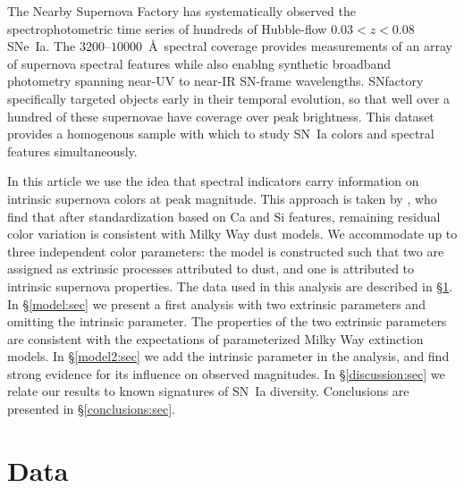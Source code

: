 \documentclass{aastex61}   	%
\begin{document}
The Nearby Supernova Factory \citep[SNfactory;][]{2002SPIE.4836...61A} has systematically observed the
spectrophotometric time series of hundreds of Hubble-flow $0.03<z<0.08$ SNe~Ia.   The $3200$--$10000$~\AA\ spectral coverage
provides measurements of an array of supernova spectral features while also enablng synthetic broadband photometry
spanning near-UV to near-IR SN-frame wavelengths.  SNfactory specifically targeted objects
early in their temporal evolution, so that well over a hundred of these supernovae have  coverage over
peak brightness.  This dataset provides a homogenous sample with which to study SN~Ia colors and spectral features simultaneously.

In this article we use the idea that spectral indicators carry information on intrinsic supernova colors at peak magnitude.
This approach is taken by \citet{2011A&A...529L...4C}, who find that after standardization based on Ca and Si features, remaining residual color
variation is consistent with Milky Way dust models.
We accommodate up to  three independent color parameters: the model is constructed such that 
two are assigned as extrinsic processes attributed to dust, and one is attributed to intrinsic supernova
properties.
The data used in this analysis are described in \S\ref{data:sec}.
In \S\ref{model:sec} we present a
first analysis with two extrinsic parameters and omitting the intrinsic parameter.  The properties of the two extrinsic parameters
are consistent with the expectations of parameterized Milky Way extinction models.
In \S\ref{model2:sec} we add the intrinsic parameter in the analysis, and find strong evidence for its influence on observed magnitudes.
In  \S\ref{discussion:sec}
we relate our results to known
signatures of SN~Ia diversity.
Conclusions are presented in \S\ref{conclusions:sec}.

\section{Data}
\label{data:sec}
\end{document}
